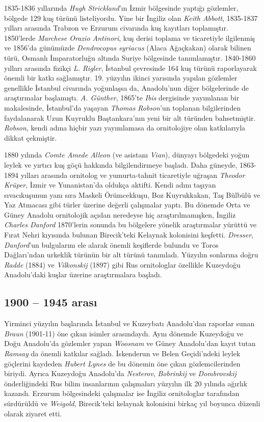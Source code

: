 \documentclass[
  a4paper,
  DIV=11,
  numbers=noendperiod]{scrreprt}
\begin{document}
1835-1836 yıllarında \emph{Hugh Strickland}'ın İzmir bölgesinde yaptığı
gözlemler, bölgede 129 kuş türünü listeliyordu. Yine bir İngiliz olan
\emph{Keith Abbott}, 1835-1837 yılları arasında Trabzon ve Erzurum
civarında kuş kayıtları toplamıştır. 1850'lerde \emph{Marchese Orazio
Antinori}, kuş derisi toplama ve ticaretiyle ilgilenmiş ve 1856'da
günümüzde \emph{Dendrocopus syriacus} (Alaca Ağaçkakan) olarak bilinen
türü, Osmanlı İmparatorluğu altında Suriye bölgesinde tanımlamıştır.
1840-1860 yılları arasında fizikçi \emph{L. Rigler}, İstanbul çevresinde
164 kuş türünü raporlayarak önemli bir katkı sağlamıştır. 19. yüzyılın
ikinci yarısında yapılan gözlemler genellikle İstanbul civarında
yoğunlaşsa da, Anadolu'nun diğer bölgelerinde de araştırmalar
başlamıştı. \emph{A. Günther}, 1865'te \emph{Ibis} dergisinde yayımlanan
bir makalesinde, İstanbul'da yaşayan \emph{Thomas Robson}'un toplanan
bilgilerinden faydalanarak Uzun Kuyruklu Baştankara'nın yeni bir alt
türünden bahsetmiştir. \emph{Robson}, kendi adına hiçbir yazı
yayımlamasa da ornitolojiye olan katkılarıyla dikkat çekmiştir.

1880 yılında \emph{Comte Amede Alleon} (ve asistanı \emph{Vian}),
dünyayı bölgedeki yoğun leylek ve yırtıcı kuş göçü hakkında
bilgilendirmeye başladı. Daha güneyde, 1863-1894 yılları arasında
ornitolog ve yumurta-tahnit ticaretiyle uğraşan \emph{Theodor Krüper},
İzmir ve Yunanistan'da oldukça aktifti. Kendi adını taşıyan
sıvacıkuşunun yanı sıra Maskeli Örümcekkuşu, Boz Kuyrukkakan, Taş
Bülbülü ve Yaz Atmacası gibi türler üzerine değerli çalışmalar yaptı. Bu
dönemde Orta ve Güney Anadolu ornitolojik açıdan neredeyse hiç
araştırılmamışken, İngiliz \emph{Charles Danford} 1870'lerin sonunda bu
bölgelere yönelik araştırmalar yürüttü ve Fırat Nehri kıyısında bulunan
Birecik'teki Kelaynak kolonisini keşfetti. \emph{Dresser},
\emph{Danford}'un bulgularını ele alarak önemli keşiflerde bulundu ve
Toros Dağları'ndan urkeklik türünün bir alt türünü tanımladı. Yüzyılın
sonlarına doğru \emph{Radde} (1884) ve \emph{Vilkonskij} (1897) gibi Rus
ornitologlar özellikle Kuzeydoğu Anadolu'daki kuşlar üzerine
araştırmalara başladı.

\subsection*{1900 -- 1945 arası}\label{arasux131}

Yirminci yüzyılın başlarında İstanbul ve Kuzeybatı Anadolu'dan raporlar
sunan \emph{Braun} (1901-11) öne çıkan isimler arasındaydı. Aynı dönemde
Kuzeydoğu ve Doğu Anadolu'da gözlemler yapan \emph{Woosnam} ve Güney
Anadolu'dan kayıt tutan \emph{Ramsay} da önemli katkılar sağladı.
İskenderun ve Belen Geçidi'ndeki leylek göçlerini kaydeden \emph{Hubert
Lynes} de bu dönemin öne çıkan gözlemcilerinden biriydi. Ayrıca
Kuzeydoğu Anadolu'da \emph{Nesterov}, \emph{Bobrinkij} ve
\emph{Dombrovskij} önderliğindeki Rus bilim insanlarının çalışmaları
yüzyılın ilk 20 yılında ağırlık kazandı. Erzurum bölgesindeki çalışmalar
ise İngiliz ornitologlar tarafından sürdürüldü ve \emph{Weigold},
Birecik'teki kelaynak kolonisini birkaç yıl boyunca düzenli olarak
ziyaret etti.
\end{document}

